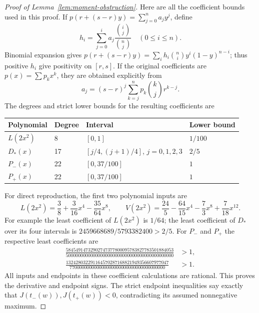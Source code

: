 \begin{proof}[Proof of Lemma~\ref{lem:moment-obstruction}]
Here are all the coefficient bounds used in this proof.  If
$p(r+(s-r)y)=\sum_{j=0}^n a_jy^j$, define
\[
 h_i=\sum_{j=0}^i a_j\frac{\binom{i}{j}}{\binom nj}
 \quad(0\le i\le n).
\]
Binomial expansion gives
$p(r+(s-r)y)=\sum_i h_i\binom ni y^i(1-y)^{n-i}$; thus positive $h_i$
give positivity on $[r,s]$.  If the original coefficients are
$p(x)=\sum p_kx^k$, they are obtained explicitly from
\[
 a_j=(s-r)^j\sum_{k=j}^n p_k\binom{k}{j}r^{k-j}.
\]
The degrees and strict lower bounds for the resulting coefficients are
\begin{center}
\begin{tabular}{@{}llll@{}}
\toprule
Polynomial & Degree & Interval & Lower bound\\
\midrule
$L(2x^2)$ &8&$[0,1]$&$1/100$\\
$D_*(x)$ &17&$[j/4,(j+1)/4]$, $j=0,1,2,3$&$2/5$\\
$P_-(x)$ &22&$[0,37/100]$&$1$\\
$P_+(x)$ &22&$[0,37/100]$&$1$\\
\bottomrule
\end{tabular}
\end{center}
For direct reproduction, the first two polynomial inputs are
\[
 L(2x^2)=\frac38+\frac3{16}x^4-\frac{35}{64}x^8,
 \qquad
 V(2x^2)=\frac{24}{5}-\frac{64}{15}x^4-\frac73x^8+\frac7{18}x^{12}.
\]
For example the least coefficient of $L(2x^2)$ is $1/64$; the least
coefficient of $D_*$ over its four intervals is
$2459668689/5793382400>2/5$.  For $P_-$ and $P_+$ the respective least
coefficients are
\[
 \begin{aligned}
 \frac{58454914732902747377800095783827783501884053}
      {50000000000000000000000000000000000000000000}&>1,\\
 \frac{132428032291164570287168821949356607977047}
      {770000000000000000000000000000000000000}&>1.
 \end{aligned}
\]
All inputs and endpoints in these coefficient calculations are rational.
This proves the derivative and endpoint signs.  The strict endpoint
inequalities say exactly that $J(t_-(w)),J(t_+(w))<0$, contradicting its
assumed nonnegative maximum.
\end{proof}
